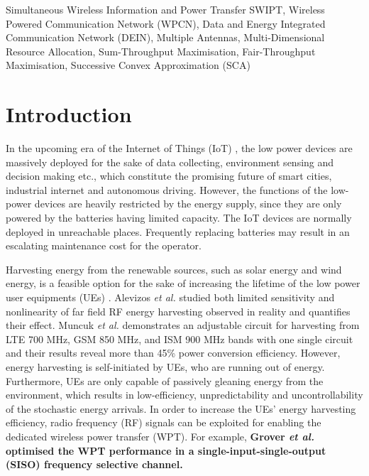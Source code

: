 \documentclass[12pt,draft,onecolumn,journal]{IEEEtran}
\begin{document}
\begin{IEEEkeywords}
	Simultaneous Wireless Information and Power Transfer SWIPT, Wireless Powered Communication Network (WPCN), Data and Energy Integrated Communication Network (DEIN), Multiple Antennas, Multi-Dimensional Resource Allocation, Sum-Throughput Maximisation, Fair-Throughput Maximisation, Successive Convex Approximation (SCA)
\end{IEEEkeywords}


\section{Introduction}

In the upcoming era of the Internet of Things (IoT) \cite{IOT}, the low power devices are massively deployed for the sake of data collecting, environment sensing and decision making etc., which constitute the promising future of smart cities, industrial internet and autonomous driving. However, the functions of the low-power devices are heavily restricted by the energy supply, since they are only powered by the batteries having limited capacity. The IoT devices are normally deployed in unreachable places. Frequently replacing batteries may result in an escalating maintenance cost for the operator.

Harvesting energy from the renewable sources, such as solar energy and wind energy, is a feasible option for the sake of increasing the lifetime of the low power user equipments (UEs) \cite{IEEE:EH}. Alevizos \textit{et al.} \cite{RF_EH_1} studied both limited sensitivity and nonlinearity of far field RF energy harvesting observed in reality and quantifies their effect. Muncuk \textit{et al. } \cite{RF_EH_2} demonstrates an adjustable circuit for harvesting from LTE 700 MHz, GSM 850 MHz, and ISM 900 MHz bands with one single circuit and their results reveal more than 45\% power conversion efficiency. However, energy harvesting is self-initiated by UEs, who are running out of energy. Furthermore, UEs are only capable of passively gleaning energy from the environment, which results in low-efficiency,  unpredictability and uncontrollability of the stochastic energy arrivals. In order to increase the UEs' energy harvesting efficiency, radio frequency (RF) signals can be exploited for enabling the dedicated wireless power transfer (WPT). For example, \textbf{Grover \textit{et al.} \cite{IEEE:swipt_2} optimised the WPT performance in a single-input-single-output (SISO) frequency selective channel. }
\end{document}
